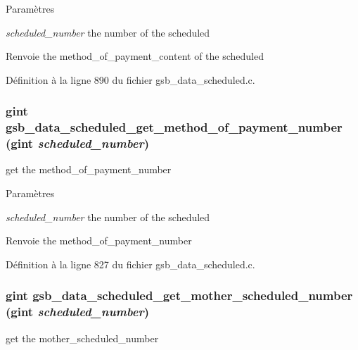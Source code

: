 \begin{DoxyParams}{Paramètres}
\item[{\em scheduled\_\-number}]the number of the scheduled\end{DoxyParams}
\begin{DoxyReturn}{Renvoie}
the method\_\-of\_\-payment\_\-content of the scheduled 
\end{DoxyReturn}


Définition à la ligne 890 du fichier gsb\_\-data\_\-scheduled.c.

\subsubsection[{gsb\_\-data\_\-scheduled\_\-get\_\-method\_\-of\_\-payment\_\-number}]{\setlength{\rightskip}{0pt plus 5cm}gint gsb\_\-data\_\-scheduled\_\-get\_\-method\_\-of\_\-payment\_\-number (gint {\em scheduled\_\-number})}\label{gsb__data__scheduled_8c_acd7da6799398885afd2e3a58eaa7fe1a}
get the method\_\-of\_\-payment\_\-number


\begin{DoxyParams}{Paramètres}
\item[{\em scheduled\_\-number}]the number of the scheduled\end{DoxyParams}
\begin{DoxyReturn}{Renvoie}
the method\_\-of\_\-payment\_\-number 
\end{DoxyReturn}


Définition à la ligne 827 du fichier gsb\_\-data\_\-scheduled.c.

\subsubsection[{gsb\_\-data\_\-scheduled\_\-get\_\-mother\_\-scheduled\_\-number}]{\setlength{\rightskip}{0pt plus 5cm}gint gsb\_\-data\_\-scheduled\_\-get\_\-mother\_\-scheduled\_\-number (gint {\em scheduled\_\-number})}\label{gsb__data__scheduled_8c_a3f8e6e2985be6cb88c0f38965b75d804}
get the mother\_\-scheduled\_\-number


